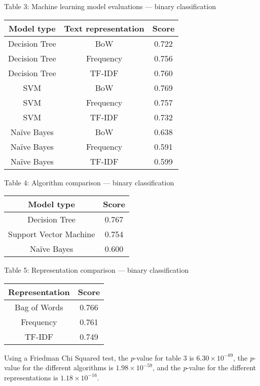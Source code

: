 \documentclass{article}
\begin{document}
\begin{center}
Table 3: Machine learning model evaluations --- binary classification
\begin{tabular}{ |c|c|c| }
\hline {\bf Model type} & {\bf Text representation} & {\bf Score}\\
\hline Decision Tree & BoW & 0.722\\
\hline Decision Tree & Frequency & 0.756\\
\hline Decision Tree & TF-IDF & 0.760\\
\hline SVM & BoW & 0.769\\
\hline SVM & Frequency & 0.757\\
\hline SVM & TF-IDF & 0.732\\
\hline Naïve Bayes & BoW & 0.638\\
\hline Naïve Bayes & Frequency & 0.591\\
\hline Naïve Bayes & TF-IDF & 0.599\\
\hline
\end{tabular}
\end{center}

\begin{center}
Table 4: Algorithm comparison --- binary classification\\
\begin{tabular}{ |c|c| }
\hline {\bf Model type}& {\bf Score}\\
\hline Decision Tree & 0.767\\
\hline Support Vector Machine & 0.754\\
\hline Naïve Bayes & 0.600\\
\hline
\end{tabular}
\end{center}

\begin{center}
Table 5: Representation comparison --- binary classification\\
\begin{tabular}{ |c|c| }
\hline {\bf Representation}& {\bf Score}\\
\hline Bag of Words & 0.766\\
\hline Frequency & 0.761\\
\hline TF-IDF & 0.749\\
\hline
\end{tabular}
\end{center}

Using a Friedman Chi Squared test, the \emph{p}-value for table 3 is $6.30 \times 10^{-89}$, the \emph{p}-value for the different algorithms is $1.98 \times 10^{-59}$, and the \emph{p}-value for the different representations is $1.18 \times 10^{-16}$.
\end{document}
